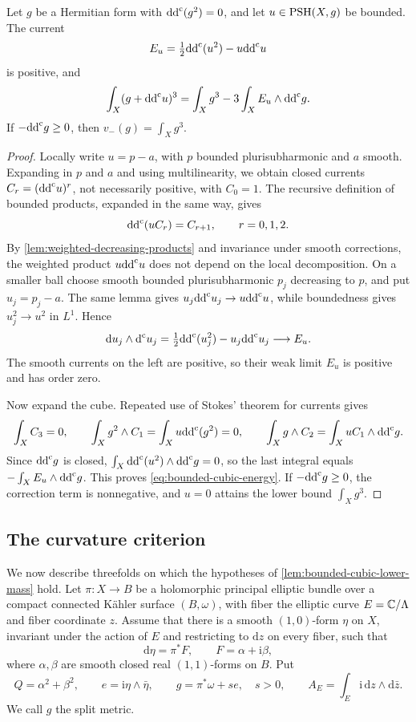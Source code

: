 \begin{lemma}\label{lem:bounded-cubic-lower-mass}
Let $g$ be a Hermitian form with $\mathrm{dd}^{\mathrm{c}}(g^2)=0$, and let $u\in\mathrm{PSH}(X,g)$ be bounded. The current
\[
 E_u=\tfrac12\mathrm{dd}^{\mathrm{c}}(u^2)-u\mathrm{dd}^{\mathrm{c}} u
\]
is positive, and
\begin{equation}\label{eq:bounded-cubic-energy}
 \int_X(g+\mathrm{dd}^{\mathrm{c}} u)^3
 =\int_Xg^3-3\int_XE_u\wedge\mathrm{dd}^{\mathrm{c}} g.
\end{equation}
If $-\mathrm{dd}^{\mathrm{c}} g\geq0$, then $v_-(g)=\int_Xg^3$.
\end{lemma}
\begin{proof}
Locally write $u=p-a$, with $p$ bounded plurisubharmonic and $a$ smooth. Expanding in $p$ and $a$ and using multilinearity, we obtain closed currents $C_r=(\mathrm{dd}^{\mathrm{c}} u)^r$, not necessarily positive, with $C_0=1$. The recursive definition of bounded products, expanded in the same way, gives
\[
 \mathrm{dd}^{\mathrm{c}}(uC_r)=C_{r+1},\qquad r=0,1,2.
\]
By \cref{lem:weighted-decreasing-products} and invariance under smooth corrections, the weighted product $u\mathrm{dd}^{\mathrm{c}} u$ does not depend on the local decomposition. On a smaller ball choose smooth bounded plurisubharmonic $p_j$ decreasing to $p$, and put $u_j=p_j-a$. The same lemma gives $u_j\mathrm{dd}^{\mathrm{c}} u_j\to u\mathrm{dd}^{\mathrm{c}} u$, while boundedness gives $u_j^2\to u^2$ in $L^1$. Hence
\[
 \mathrm du_j\wedge\mathrm d^{\mathrm c} u_j
 =\tfrac12\mathrm{dd}^{\mathrm{c}}(u_j^2)-u_j\mathrm{dd}^{\mathrm{c}} u_j\longrightarrow E_u.
\]
The smooth currents on the left are positive, so their weak limit $E_u$ is positive and has order zero.

Now expand the cube. Repeated use of Stokes' theorem for currents gives
\[
 \int_XC_3=0,\qquad
 \int_Xg^2\wedge C_1=\int_Xu\mathrm{dd}^{\mathrm{c}}(g^2)=0,
 \qquad
 \int_Xg\wedge C_2=\int_XuC_1\wedge\mathrm{dd}^{\mathrm{c}} g.
\]
Since $\mathrm{dd}^{\mathrm{c}} g$ is closed, $\int_X\mathrm{dd}^{\mathrm{c}}(u^2)\wedge\mathrm{dd}^{\mathrm{c}} g=0$, so the last integral equals $-\int_XE_u\wedge\mathrm{dd}^{\mathrm{c}} g$. This proves \eqref{eq:bounded-cubic-energy}. If $-\mathrm{dd}^{\mathrm{c}} g\geq0$, the correction term is nonnegative, and $u=0$ attains the lower bound $\int_Xg^3$.
\end{proof}

\subsection{The curvature criterion}

We now describe threefolds on which the hypotheses of \cref{lem:bounded-cubic-lower-mass} hold. Let $\pi\colon X\to B$ be a holomorphic principal elliptic bundle over a compact connected K\"ahler surface $(B,\omega)$, with fiber the elliptic curve $E=\mathbb C/\Lambda$ and fiber coordinate $z$. Assume that there is a smooth $(1,0)$-form $\eta$ on $X$, invariant under the action of $E$ and restricting to $\mathrm dz$ on every fiber, such that
\[
 \mathrm d\eta=\pi^*F,\qquad F=\alpha+\mathrm i\beta,
\]
where $\alpha,\beta$ are smooth closed real $(1,1)$-forms on $B$. Put
\[
 Q=\alpha^2+\beta^2,\qquad e=\mathrm i\eta\wedge\bar\eta,
 \qquad g=\pi^*\omega+s e,\quad s>0,
 \qquad A_E=\int_E\mathrm i\,\mathrm dz\wedge\mathrm d\bar z.
\]
We call $g$ the split metric.

